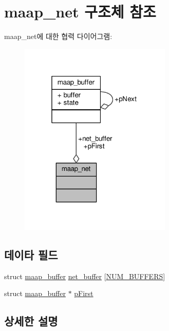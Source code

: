 \hypertarget{structmaap__net}{}\section{maap\+\_\+net 구조체 참조}
\label{structmaap__net}


maap\+\_\+net에 대한 협력 다이어그램\+:
\nopagebreak
\begin{figure}[H]
\begin{center}
\leavevmode
\includegraphics[width=205pt]{structmaap__net__coll__graph}
\end{center}
\end{figure}
\subsection*{데이타 필드}
\begin{DoxyCompactItemize}
\item 
struct \hyperlink{structmaap__buffer}{maap\+\_\+buffer} \hyperlink{structmaap__net_a627d243adeb3b72479c5a09aa7d6e2d9}{net\+\_\+buffer} \mbox{[}\hyperlink{maap__net_8c_aac028f4c15ac7f78a44be5db76cfbec7}{N\+U\+M\+\_\+\+B\+U\+F\+F\+E\+RS}\mbox{]}
\item 
struct \hyperlink{structmaap__buffer}{maap\+\_\+buffer} $\ast$ \hyperlink{structmaap__net_afb79ef5b6ddb7d9fc9be7ae916af425a}{p\+First}
\end{DoxyCompactItemize}


\subsection{상세한 설명}


